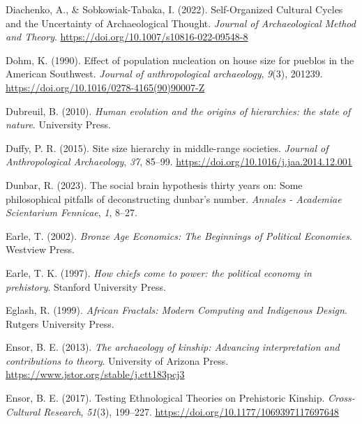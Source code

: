 \documentclass[
  12pt,
]{book}
\newlength{\cslhangindent}
\newlength{\cslentryspacingunit} %
\newenvironment{CSLReferences}[2] %
 {%
  \setlength{\parindent}{0pt}
  \ifodd #1
  \let\oldpar\par
  \def\par{\hangindent=\cslhangindent\oldpar}
  \fi
  \setlength{\parskip}{#2\cslentryspacingunit}
 }%
 {}
\begin{document}
\begin{CSLReferences}{1}{0}
\leavevmode{}%
Diachenko, A., \& Sobkowiak-Tabaka, I. (2022). Self-{Organized Cultural Cycles} and the {Uncertainty} of {Archaeological Thought}. \emph{Journal of Archaeological Method and Theory}. \url{https://doi.org/10.1007/s10816-022-09548-8}

\leavevmode{}%
Dohm, K. (1990). Effect of population nucleation on house size for pueblos in the American Southwest. \emph{Journal of anthropological archaeology}, \emph{9}(3), 201239. \url{https://doi.org/10.1016/0278-4165(90)90007-Z}

\leavevmode{}%
Dubreuil, B. (2010). \emph{Human evolution and the origins of hierarchies: the state of nature}. University Press.

\leavevmode{}%
Duffy, P. R. (2015). Site size hierarchy in middle-range societies. \emph{Journal of Anthropological Archaeology}, \emph{37}, 85--99. \url{https://doi.org/10.1016/j.jaa.2014.12.001}

\leavevmode{}%
Dunbar, R. (2023). The social brain hypothesis thirty years on: Some philosophical pitfalls of deconstructing dunbar's number. \emph{Annales - Academiae Scientarium Fennicae}, \emph{1}, 8--27.

\leavevmode{}%
Earle, T. (2002). \emph{Bronze Age Economics: The Beginnings of Political Economies}. Westview Press.

\leavevmode{}%
Earle, T. K. (1997). \emph{How chiefs come to power: the political economy in prehistory}. Stanford University Press.

\leavevmode{}%
Eglash, R. (1999). \emph{African Fractals: Modern Computing and Indigenous Design}. Rutgers University Press.

\leavevmode{}%
Ensor, B. E. (2013). \emph{The archaeology of kinship: Advancing interpretation and contributions to theory}. University of Arizona Press. \url{https://www.jstor.org/stable/j.ctt183pcj3}

\leavevmode{}%
Ensor, B. E. (2017). Testing Ethnological Theories on Prehistoric Kinship. \emph{Cross-Cultural Research}, \emph{51}(3), 199--227. \url{https://doi.org/10.1177/1069397117697648}


\end{CSLReferences}
\end{document}
